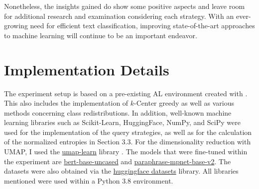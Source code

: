 \documentclass[english,bachelor,ul]{webisthesis} %
\begin{document}
Nonetheless, the insights gained do show some positive aspects and leave room for additional research and examination considering each strategy. With an ever-growing need for efficient text classification, improving state-of-the-art approaches to machine learning will continue to be an important endeavor.






%
%

%

\appendix
\chapter{Implementation Details}

The experiment setup is based on a pre-existing AL environment created with \cite{schroeder2023small-text}. This also includes the implementation of $k$-Center greedy as well as various methods concerning class redistributions. In addition, well-known machine learning libraries such as Scikit-Learn, HuggingFace, NumPy, and SciPy were used for the implementation of the query strategies, as well as for the calculation of the normalized entropies in Section 3.3. For the dimensionality reduction with UMAP, I used the \href{https://github.com/lmcinnes/umap}{umap-learn} library \citep{DBLP:journals/corr/abs-1802-03426}. The models that were fine-tuned within the experiment are \href{https://huggingface.co/google-bert/bert-base-uncased}{bert-base-uncased} and \href{https://huggingface.co/sentence-transformers/paraphrase-mpnet-base-v2}{
paraphrase-mpnet-base-v2}. The datasets were also obtained via the \href{https://github.com/huggingface/datasets}{huggingface datasets} library. All libraries mentioned were used within a Python 3.8 environment.

\end{document}
